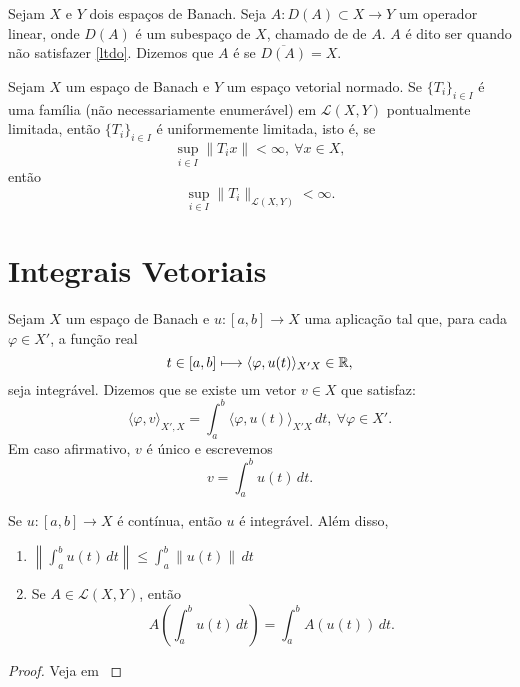 Sejam $X$ e $Y$ dois espaços de Banach. Seja $A:D(A)\subset X\longrightarrow Y$ um operador linear,  onde $D(A)$ é um subespaço de $X$, chamado de  de $A$.
$A$ é dito ser   quando não satisfazer \eqref{ltdo}. Dizemos que $A$ é   se $\overline{D(A)}=X$.

\begin{theorem}\label{th-BS}
	Sejam $X$ um espaço de Banach e $Y$ um espaço vetorial normado. Se $\{T_i\}_{i\in I}$  é uma família (não necessariamente enumerável) em $\mathcal{L}(X,Y)$ pontualmente limitada, então $\{T_i\}_{i\in I}$ é uniformemente limitada, isto é, se 
	 \[\sup_{i\in I}\|T_ix\|< \infty,\ \forall x\in X,\] 
	 então
	 \[\sup_{i\in I}\|T_i\|_{\mathcal{L}(X,Y)}<\infty.\]
\end{theorem}

\section{Integrais Vetoriais}

\begin{definition}
Sejam $X$ um espaço de Banach e $u:[a,b]\longrightarrow X$ uma aplicação tal que, para cada $\varphi\in X'$,  a função real
\[t\in [a,b] \longmapsto \langle\varphi, u(t) \rangle_{X'X}\in \mathbb{R},\]
seja integrável. Dizemos que  se existe um vetor $v\in X$ que satisfaz:
\[\langle \varphi, v\rangle_{X',X}=\int_a^b \langle\varphi, u(t) \rangle_{X'X}\,dt,\ \forall \varphi\in X'.\]
Em caso afirmativo, $v$ é único e escrevemos
\[v=\int_a^b u(t)\,dt.\]
\end{definition}

\begin{proposition}\label{KthA3.2}
Se $u:[a,b]\longrightarrow X$ é {contínua}, então $u$ é integrável. Além disso, 
\begin{enumerate}
    \item $\displaystyle\left\|\int_a^b u(t)\,dt\right\|\leq \int_a^b \|u(t)\|\,dt$
    \item Se $A\in \mathcal{L}(X,Y)$, então
    \[ A\left(\int_a^b u(t)\,dt\right)=\int_a^b A(u(t))\,dt. \]
\end{enumerate}
\end{proposition}
\begin{proof}
Veja em \cite[Theorem A3.2]{kesavan2015topics}
\end{proof}

